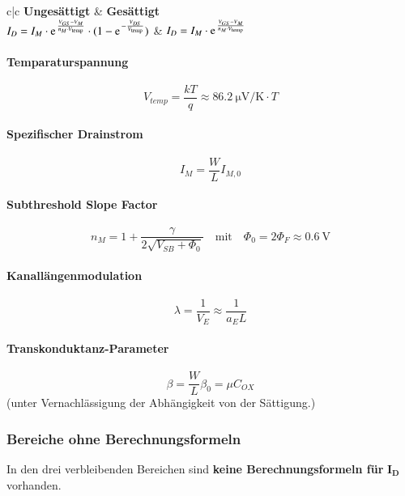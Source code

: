 \renewcommand{\arraystretch}{1.5}
\begin{ctabular}{c|c}
    \textbf{Ungesättigt}                                                                                                & \textbf{Gesättigt}                                                    \\
    $I_D = I_M \cdot \e^{\frac{V_{GS} - V_M}{n_M \cdot V_\text{temp}}} \cdot (1 - \e^{-\frac{V_{DS}}{V_\text{temp}}})$  & $I_D = I_M \cdot \e^{\frac{V_{GS} - V_M}{n_M \cdot V_\text{temp}}}$
\end{ctabular}
\renewcommand{\arraystretch}{1}

\paragraph{Temparaturspannung}
\[
    V_{temp} = \frac{k T}{q} \approx \qty{86.2}{\micro\volt\per\kelvin} \cdot T
\]

\paragraph{Spezifischer Drainstrom}
\[
    I_M = \frac{W}{L} I_{M, 0}
\]

\paragraph{Subthreshold Slope Factor}
\[
    n_M = 1 + \frac{\gamma}{2\sqrt{V_{SB}+\Phi_0}} \quad \text{mit} \quad \Phi_0 = 2 \Phi_F \approx \qty{0.6}{\volt}
\]

\paragraph{Kanallängenmodulation}
\[
    \lambda = \frac{1}{V_E} \approx \frac{1}{a_E L}
\]

\paragraph{Transkonduktanz-Parameter}
\[
    \beta = \frac{W}{L}\beta_0 = \mu C_{OX}
\]
(unter Vernachlässigung der Abhängigkeit von der Sättigung.)

\subsubsection{Bereiche ohne Berechnungsformeln}

In den drei verbleibenden Bereichen sind \textbf{keine Berechnungsformeln für} $\bm{I_D}$ vorhanden.

